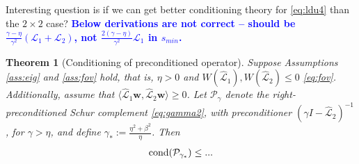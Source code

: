\documentclass[a4paper,10pt]{article}
\newtheorem{theorem}{Theorem}
\newcommand{\tcb}{\textcolor{blue}}
\begin{document}
Interesting question is if we can get better conditioning theory for \eqref{eq:ldu4}
than the $2\times 2$ case?
\textbf{\tcb{Below derivations are not correct -- should be $\frac{\gamma-\eta}{\gamma^2}(\mathcal{L}_1+\mathcal{L}_2)$, not $\frac{2(\gamma-\eta)}{\gamma^2}\mathcal{L}_1$ in $s_{min}$.}}

\begin{theorem}[Conditioning of preconditioned operator]\label{th:cond}
Suppose Assumptions \ref{ass:eig} and \ref{ass:fov} hold, that is, $\eta > 0$
and $W(\widehat{\mathcal{L}}_1),W(\widehat{\mathcal{L}}_2) \leq 0$ \eqref{eq:fov}.
Additionally, assume that $\langle\widehat{\mathcal{L}}_1\mathbf{w},
\widehat{\mathcal{L}}_2\mathbf{w}\rangle\geq 0$. Let $\mathcal{P}_\gamma$
denote the right-preconditioned Schur complement \eqref{eq:gamma2}, with
preconditioner $(\gamma I - \widehat{\mathcal{L}}_2)^{-1}$, for $\gamma >\eta$,
and define $\gamma_* := \tfrac{\eta^2+\beta^2}{\eta}$. Then
\begin{align}\label{eq:gammastar_cond}
\textnormal{cond}(\mathcal{P}_{\gamma_*}) \leq ...
\end{align}
\end{theorem}
\end{document}
